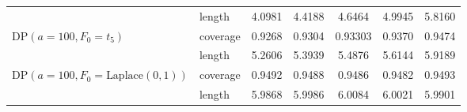 \documentclass[11pt]{article}
\begin{document}
\begin{table}[htbp]
{\begin{tabular}{l l | c c c c c}
& length & 4.0981 & 4.4188 & 4.6464 & 4.9945 & 5.8160\\
DP$(a=100, F_0=t_5)$
& coverage & 0.9268 & 0.9304 & 0.93303 & 0.9370 & 0.9474 \\
& length & 5.2606 & 5.3939 & 5.4876 & 5.6144 & 5.9189 \\
DP$(a=100, F_0=\text{Laplace}(0,1))$
& coverage & 0.9492 & 0.9488 & 0.9486 & 0.9482 & 0.9493 \\
& length & 5.9868 & 5.9986 & 6.0084 & 6.0021 & 5.9901 \\
\hline
\end{tabular}
}
\end{table}
\end{document}
